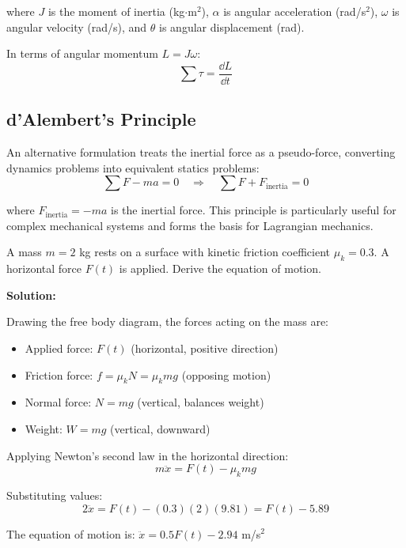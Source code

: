 where $J$ is the moment of inertia (kg$\cdot$m$^2$), $\alpha$ is angular acceleration (rad/s$^2$), $\omega$ is angular velocity (rad/s), and $\theta$ is angular displacement (rad).

In terms of angular momentum $L = J\omega$:
\begin{equation}
\sum \tau = \frac{\dd L}{\dd t}
\end{equation}

\subsection{d'Alembert's Principle}

An alternative formulation treats the inertial force as a pseudo-force, converting dynamics problems into equivalent statics problems:
\begin{equation}
\sum F - ma = 0 \quad \Rightarrow \quad \sum F + F_{\text{inertia}} = 0
\label{eq:dalembert}
\end{equation}

where $F_{\text{inertia}} = -ma$ is the inertial force. This principle is particularly useful for complex mechanical systems and forms the basis for Lagrangian mechanics.

\begin{examplebox}[title=Example 3.1: Free Body Diagram Analysis]
A mass $m = 2$ kg rests on a surface with kinetic friction coefficient $\mu_k = 0.3$. A horizontal force $F(t)$ is applied. Derive the equation of motion.

\textbf{Solution:}

Drawing the free body diagram, the forces acting on the mass are:
\begin{itemize}
    \item Applied force: $F(t)$ (horizontal, positive direction)
    \item Friction force: $f = \mu_k N = \mu_k mg$ (opposing motion)
    \item Normal force: $N = mg$ (vertical, balances weight)
    \item Weight: $W = mg$ (vertical, downward)
\end{itemize}

Applying Newton's second law in the horizontal direction:
\begin{equation*}
m\ddot{x} = F(t) - \mu_k mg
\end{equation*}

Substituting values:
\begin{equation*}
2\ddot{x} = F(t) - (0.3)(2)(9.81) = F(t) - 5.89
\end{equation*}

The equation of motion is: $\ddot{x} = 0.5F(t) - 2.94$ m/s$^2$
\end{examplebox}

